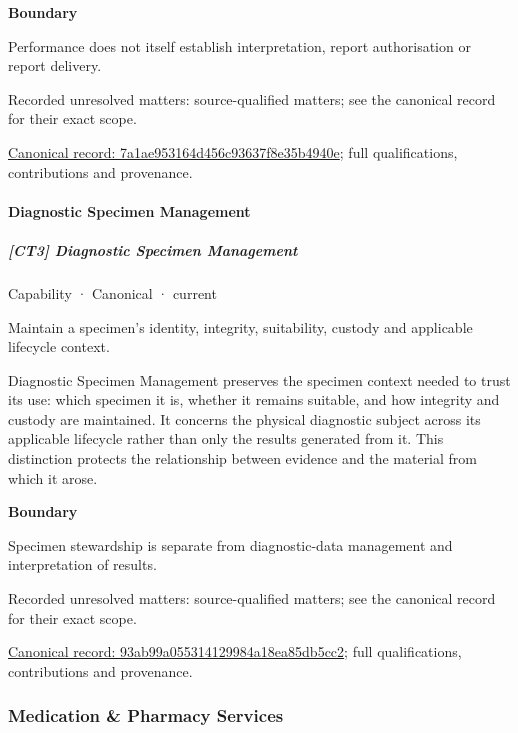 \textbf{Boundary}



Performance does not itself establish interpretation, report authorisation or report delivery.


{\small Recorded unresolved matters: source-qualified matters; see the canonical record for their exact scope.}\par
{\footnotesize \href{../../../../continuum/strategy/capability/7a1ae953164d456c93637f8e35b4940e.md}{Canonical record: 7a1ae953164d456c93637f8e35b4940e}; full qualifications, contributions and provenance.}\par
\paragraph{Diagnostic Specimen Management}

\subparagraph{[CT3] Diagnostic Specimen Management}

\label{element:93ab99a055314129984a18ea85db5cc2}
{\small Capability · Canonical · current}\par

Maintain a specimen’s identity, integrity, suitability, custody and applicable lifecycle context.



Diagnostic Specimen Management preserves the specimen context needed to trust its use: which specimen it is, whether it remains suitable, and how integrity and custody are maintained. It concerns the physical diagnostic subject across its applicable lifecycle rather than only the results generated from it. This distinction protects the relationship between evidence and the material from which it arose.



\textbf{Boundary}



Specimen stewardship is separate from diagnostic-data management and interpretation of results.


{\small Recorded unresolved matters: source-qualified matters; see the canonical record for their exact scope.}\par
{\footnotesize \href{../../../../continuum/strategy/capability/93ab99a055314129984a18ea85db5cc2.md}{Canonical record: 93ab99a055314129984a18ea85db5cc2}; full qualifications, contributions and provenance.}\par
\subsubsection{Medication \& Pharmacy Services}

